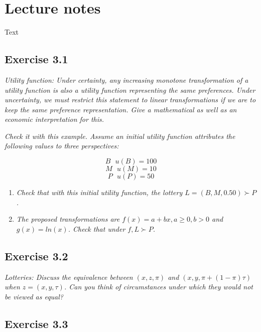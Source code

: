 \documentclass[]{book}
\theoremstyle{definition}
\theoremstyle{definition}
\theoremstyle{remark}
\begin{document}
\section{Lecture notes}\label{lecture-notes-1}

Text

\subsection{Exercise 3.1}\label{exercise-3.1}

\emph{Utility function: Under certainty, any increasing monotone
transformation of a utility function is also a utility function
representing the same preferences. Under uncertainty, we must restrict
this statement to linear transformations if we are to keep the same
preference representation. Give a mathematical as well as an economic
interpretation for this.} \citep[p.4]{exercises_danthine}

\emph{Check it with this example. Assume an initial utility function
attributes the following values to three perspectives:}
\citep[p.4]{exercises_danthine}

\[B \ \ \ u\left(B\right)=100\] \[M \ \ \ u\left(M\right)=10\]
\[P \ \ \ u\left(P\right)=50\]

\begin{enumerate}
\def\labelenumi{\alph{enumi}.}
\item
  \emph{Check that with this initial utility function, the lottery
  \(L=\left(B,M,0.50\right)\succ P\).} \citep[p.4]{exercises_danthine}
\item
  \emph{The proposed transformations are
  \(f\left(x\right)=a+bx, a\geq 0,b>0\) and
  \(g\left(x\right)=ln\left(x\right)\). Check that under
  \(f, L\succ P\).} \citep[p.5]{exercises_danthine}
\end{enumerate}

\subsection{Exercise 3.2}\label{exercise-3.2}

\emph{Lotteries: Discuss the equivalence between
\(\left(x,z,\pi\right)\) and
\(\left(x,y,\pi+\left(1-\pi\right)\tau\right)\) when
\(z=\left(x,y,\tau\right)\). Can you think of circumstances under which
they would not be viewed as equal?} \citep[p.5]{exercises_danthine}

\subsection{Exercise 3.3}\label{exercise-3.3}
\end{document}
